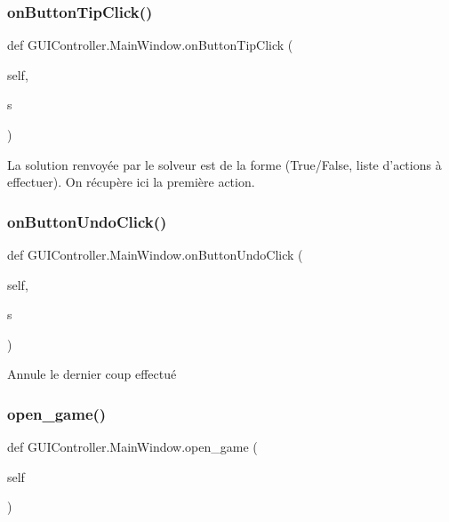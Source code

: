 \subsubsection{\texorpdfstring{on\+Button\+Tip\+Click()}{onButtonTipClick()}}
{\footnotesize\ttfamily def G\+U\+I\+Controller.\+Main\+Window.\+on\+Button\+Tip\+Click (\begin{DoxyParamCaption}\item[{}]{self,  }\item[{}]{s }\end{DoxyParamCaption})}

\begin{DoxyVerb}La solution renvoyée par le solveur est de la forme (True/False, liste d'actions à effectuer).
On récupère ici la première action.\end{DoxyVerb}
 \mbox{\label{classGUIController_1_1MainWindow_a68b891f21fd322728889657173560a64}} 
\subsubsection{\texorpdfstring{on\+Button\+Undo\+Click()}{onButtonUndoClick()}}
{\footnotesize\ttfamily def G\+U\+I\+Controller.\+Main\+Window.\+on\+Button\+Undo\+Click (\begin{DoxyParamCaption}\item[{}]{self,  }\item[{}]{s }\end{DoxyParamCaption})}

\begin{DoxyVerb}Annule le dernier coup effectué \end{DoxyVerb}
 \mbox{\label{classGUIController_1_1MainWindow_a0c52a408d518ea18f37a47caff1bc655}} 
\subsubsection{\texorpdfstring{open\+\_\+game()}{open\_game()}}
{\footnotesize\ttfamily def G\+U\+I\+Controller.\+Main\+Window.\+open\+\_\+game (\begin{DoxyParamCaption}\item[{}]{self }\end{DoxyParamCaption})}

